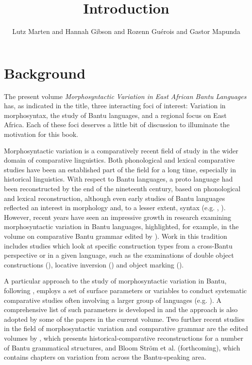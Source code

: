 \documentclass[output=paper]{langscibook}
\author{Lutz Marten\orcid{}\affiliation{SOAS University of London} and Hannah Gibson\orcid{}\affiliation{University of Essex} and Rozenn Guérois\orcid{}\affiliation{LLACAN CNRS; University of KwaZulu-Natal} and  Gastor Mapunda\orcid{}\affiliation{University of Dar es Salaam}}
\title{Introduction}
\begin{document}
\maketitle 

\section{Background}
\noindent The present volume \textit{Morphosyntactic Variation in East African Bantu Languages} has, as indicated in the title, three interacting foci of interest: Variation in morphosyntax, the study of Bantu languages, and a regional focus on East Africa. Each of these foci deserves a little bit of discussion to illuminate the motivation for this book. 

Morphosyntactic variation is a comparatively recent field of study in the wider domain of comparative linguistics. Both phonological and lexical comparative studies have been an established part of the field for a long time, especially in historical linguistics. With respect to Bantu languages, a proto language had been reconstructed by the end of the nineteenth century, based on phonological and lexical reconstruction, although even early studies of Bantu languages reflected an interest in morphology and, to a lesser extent, syntax (e.g. \citealt{Bleek1862}, \citealt{Meinhof1906}). However, recent years have seen an impressive growth in research examining morphosyntactic variation in Bantu languages, highlighted, for example, in the volume on comparative Bantu grammar edited by \citealt{Mchombo1993}). Work in this tradition includes studies which look at specific construction types from a cross-Bantu perspective or in a given language, such as the examinations of double object constructions (\citealt{BresnanMoshi1990,Rugemalira1993obj}), locative inversion (\citealt{DemuthMmusi1997,Morimoto2000,Khumalo2010}) and object marking (\citealt{Beaudoin-LietzEtAl2004,Riedel2009}).

A particular approach to the study of morphosyntactic variation in Bantu, following \citet{MartenEtAl2007}, employs a set of surface parameters or variables to conduct systematic comparative studies often involving a larger group of languages (e.g. \citealt{BaxDiercks2012,PetzellHammarström2013,MartenvanderWal2014,ZellerNgoboka2015,Mtenje2016,ShinagawaAbe2019,ShinagawaMarten2021}). A comprehensive list of such parameters is developed in \citet{GuéroisEtAl2017} and the approach is also adopted by some of the papers in the current volume. Two further recent studies in the field of morphosyntactic variation and comparative grammar are the edited volumes by \citet{BostoenEtAl2022}, which presents historical-comparative reconstructions for a number of Bantu grammatical structures, and Bloom Ström et al. (forthcoming), which contains chapters on variation from across the Bantu-speaking area.
\end{document}

